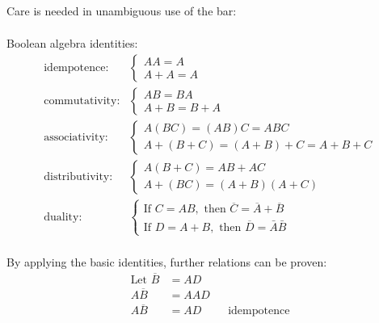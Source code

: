 \documentclass[9pt, letterpaper]{article}
\begin{document}
\begin{itemize}
\begin{itemize}
\begin{item}{Care is needed in unambiguous use of the bar:}
\begin{align*}
                \end{align*}
            \end{item}
        \end{itemize}
    \begin{item}
        Boolean algebra identities:
        \begin{align*}
            \text{idempotence:}
                &\begin{cases}
                    AA=A \\
                    A+A=A
            \end{cases} \\
            \text{commutativity:}
                &\begin{cases}
                    AB=BA \\
                    A+B=B+A
            \end{cases} \\
            \text{associativity:}
                &\begin{cases}
                    A(BC) = (AB)C = ABC \\
                    A+(B+C) = (A+B)+C = A+B+C
            \end{cases} \\
            \text{distributivity:}
                &\begin{cases}
                    A(B+C) = AB+AC \\
                    A + (BC) = (A+B)(A+C)
            \end{cases} \\
            \text{duality:}
                &\begin{cases}
                \text{If } C=AB, \text{ then } \overline{C} = \overline{A} + \overline{B} \\
                \text{If } D=A+B, \text{ then } \overline{D} = \bar{A} \bar{B}
            \end{cases} \\
        \end{align*}
        \begin{itemize}
            \begin{item}
                By applying the basic identities, further relations can be proven:
                \begin{align*}
                    \text{Let } \overline{B} &= AD \\
                    A \overline{B} &= AAD \\
                    A \overline{B} &= AD && \text{idempotence} \\

\end{align*}
\end{item}
\end{itemize}
\end{item}
\end{itemize}
\end{document}
